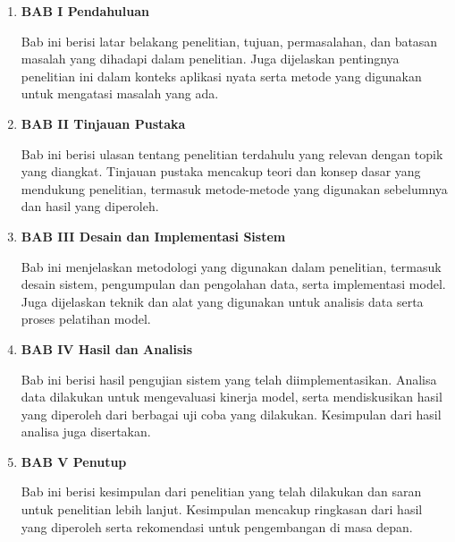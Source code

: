 \begin{enumerate}[nolistsep]

  \item \textbf{BAB I Pendahuluan}

  Bab ini berisi latar belakang penelitian, tujuan, permasalahan, dan batasan masalah yang dihadapi dalam penelitian. Juga dijelaskan pentingnya penelitian ini dalam konteks aplikasi nyata serta metode yang digunakan untuk mengatasi masalah yang ada.

        \vspace{2ex}

  \item \textbf{BAB II Tinjauan Pustaka}

  Bab ini berisi ulasan tentang penelitian terdahulu yang relevan dengan topik yang diangkat. Tinjauan pustaka mencakup teori dan konsep dasar yang mendukung penelitian, termasuk metode-metode yang digunakan sebelumnya dan hasil yang diperoleh.


        \vspace{2ex}

  \item \textbf{BAB III Desain dan Implementasi Sistem}

  Bab ini menjelaskan metodologi yang digunakan dalam penelitian, termasuk desain sistem, pengumpulan dan pengolahan data, serta implementasi model. Juga dijelaskan teknik dan alat yang digunakan untuk analisis data serta proses pelatihan model.

        \vspace{2ex}

  \item \textbf{BAB IV Hasil dan Analisis}

  Bab ini berisi hasil pengujian sistem yang telah diimplementasikan. Analisa data dilakukan untuk mengevaluasi kinerja model, serta mendiskusikan hasil yang diperoleh dari berbagai uji coba yang dilakukan. Kesimpulan dari hasil analisa juga disertakan.

        \vspace{2ex}

  \item \textbf{BAB V Penutup}

  Bab ini berisi kesimpulan dari penelitian yang telah dilakukan dan saran untuk penelitian lebih lanjut. Kesimpulan mencakup ringkasan dari hasil yang diperoleh serta rekomendasi untuk pengembangan di masa depan.

\end{enumerate}
